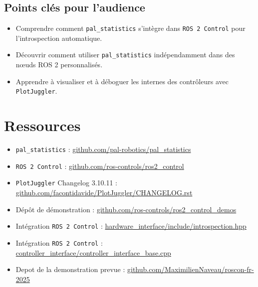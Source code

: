 \documentclass[11pt,a4paper]{article}
\begin{document}
\subsection*{Points clés pour l'audience}

\begin{itemize}
    \item Comprendre comment \texttt{pal\_statistics} s'intègre dans
          \texttt{ROS 2 Control} pour l'introspection automatique.
    \item Découvrir comment utiliser \texttt{pal\_statistics} indépendamment
    dans des nœuds ROS 2 personnalisés.
    \item Apprendre à visualiser et à déboguer les internes des contrôleurs avec
          \texttt{PlotJuggler}.
\end{itemize}

\section*{Ressources}
\begin{itemize}
    \item \texttt{pal\_statistics} :
    \href{https://github.com/pal-robotics/pal_statistics}{github.com/pal-robotics/pal\_statistics}
    \item \texttt{ROS 2 Control} :
    \href{https://github.com/ros-controls/ros2_control}{github.com/ros-controls/ros2\_control}
    \item \texttt{PlotJuggler} Changelog 3.10.11 :
    \href{https://github.com/facontidavide/PlotJuggler/blob/main/CHANGELOG.rst}{github.com/facontidavide/PlotJuggler/CHANGELOG.rst}
    \item Dépôt de démonstration :
    \href{https://github.com/ros-controls/ros2_control_demos}{github.com/ros-controls/ros2\_control\_demos}
    \item Intégration \texttt{ROS 2 Control} :
    \href{https://github.com/ros-controls/ros2_control/blob/master/hardware_interface/include/hardware_interface/introspection.hpp}{hardware\_interface/include/introspection.hpp}
    \item Intégration \texttt{ROS 2 Control} :
    \href{https://github.com/ros-controls/ros2_control/blob/master/controller_interface/src/controller_interface_base.cpp#L180C3-L180C38}{controller\_interface/controller\_interface\_base.cpp}
    \item Depot de la demonstration prevue :
    \href{https://github.com/MaximilienNaveau/roscon-fr-2025}{github.com/MaximilienNaveau/roscon-fr-2025}
\end{itemize}
\end{document}
